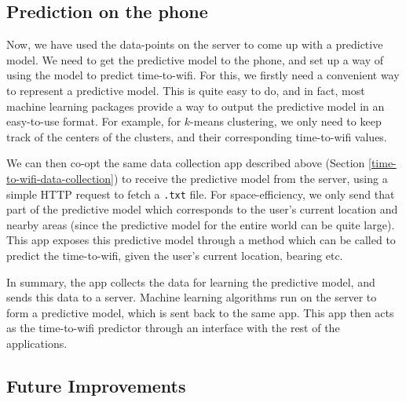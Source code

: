 \documentclass[12pt, fleqn]{article}
\begin{document}
\subsection{Prediction on the phone}

Now, we have used the data-points on the server to come up with a predictive 
model. We need to get the predictive model to the phone, and set up a way of 
using the model to predict time-to-wifi. For this, we firstly need a convenient
way to represent a predictive model. This is quite easy to do, and in fact, most 
machine learning packages provide a way to output the predictive model in 
an easy-to-use format. For example, for $k$-means clustering, we only need 
to keep track of the centers of the clusters, and their corresponding time-to-wifi values.

We can then co-opt the same data collection app described above (Section \ref{time-to-wifi-data-collection}) 
to receive the predictive model from the server, using a simple HTTP request to fetch a \texttt{.txt} file. 
For space-efficiency, we only send that part of the predictive model which corresponds 
to the user's current location and nearby areas (since the predictive model for the entire
world can be quite large). This app exposes this predictive model through a method 
which can be called to predict the time-to-wifi, given the user's current location, bearing etc. 

In summary, the app collects the data for learning the predictive model, and 
sends this data to a server. Machine learning algorithms run on the server to 
form a predictive model, which is sent back to the same app. This app then acts 
as the time-to-wifi predictor through an interface with the rest of the 
applications.

\subsection{Future Improvements}
\end{document}
